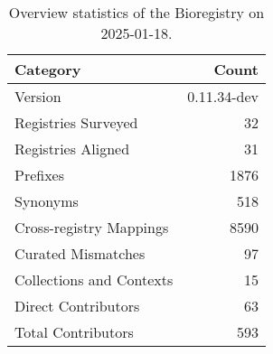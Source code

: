 \begin{table}
\caption{Overview statistics of the Bioregistry on 2025-01-18.}
\label{tab:bioregistry-summary}
\begin{tabular}{lr}
\toprule
Category & Count \\
\midrule
Version & 0.11.34-dev \\
Registries Surveyed & 32 \\
Registries Aligned & 31 \\
Prefixes & 1876 \\
Synonyms & 518 \\
Cross-registry Mappings & 8590 \\
Curated Mismatches & 97 \\
Collections and Contexts & 15 \\
Direct Contributors & 63 \\
Total Contributors & 593 \\
\bottomrule
\end{tabular}
\end{table}
